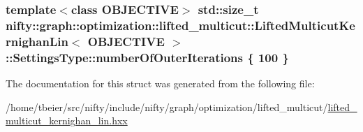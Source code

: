 \subsubsection[{number\+Of\+Outer\+Iterations}]{\setlength{\rightskip}{0pt plus 5cm}template$<$class O\+B\+J\+E\+C\+T\+I\+V\+E$>$ std\+::size\+\_\+t {\bf nifty\+::graph\+::optimization\+::lifted\+\_\+multicut\+::\+Lifted\+Multicut\+Kernighan\+Lin}$<$ O\+B\+J\+E\+C\+T\+I\+V\+E $>$\+::Settings\+Type\+::number\+Of\+Outer\+Iterations \{ 100 \}}\label{structnifty_1_1graph_1_1optimization_1_1lifted__multicut_1_1LiftedMulticutKernighanLin_1_1SettingsType_aa028d408e916d4bba213e0427663d83d}


The documentation for this struct was generated from the following file\+:\begin{DoxyCompactItemize}
\item 
/home/tbeier/src/nifty/include/nifty/graph/optimization/lifted\+\_\+multicut/\hyperlink{lifted__multicut__kernighan__lin_8hxx}{lifted\+\_\+multicut\+\_\+kernighan\+\_\+lin.\+hxx}\end{DoxyCompactItemize}
